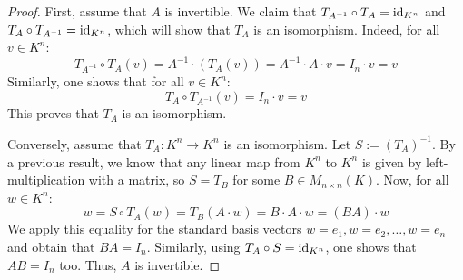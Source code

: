 \begin{proof}
First, assume that $A$ is invertible. We claim that $T_{A^{-1}} \circ T_A = \operatorname{id}_{K^n}$ and $T_A \circ T_{A^{-1}} = \operatorname{id}_{K^n}$, which will show that $T_A$ is an isomorphism. Indeed, for all $v \in K^n$:
\begin{equation*}
    T_{A^{-1}} \circ T_A(v) = A^{-1} \cdot (T_A(v)) = A^{-1} \cdot A \cdot v = I_n \cdot v = v
\end{equation*}
Similarly, one shows that for all $v \in K^n$:
\begin{equation*}
    T_A \circ T_{A^{-1}}(v) = I_n \cdot v = v
\end{equation*}
This proves that $T_A$ is an isomorphism.

Conversely, assume that $T_A: K^n \to K^n$ is an isomorphism. Let $S := (T_A)^{-1}$. By a previous result, we know that any linear map from $K^n$ to $K^n$ is given by left-multiplication with a matrix, so $S = T_B$ for some $B \in M_{n \times n}(K)$. Now, for all $w \in K^n$:
\begin{equation*}
    w = S \circ T_A(w) = T_B(A \cdot w) = B \cdot A \cdot w = (BA) \cdot w
\end{equation*}
We apply this equality for the standard basis vectors $w = e_1, w = e_2, \dots, w = e_n$ and obtain that $BA = I_n$. Similarly, using $T_A \circ S = \operatorname{id}_{K^n}$, one shows that $AB = I_n$ too. Thus, $A$ is invertible.
\end{proof}

